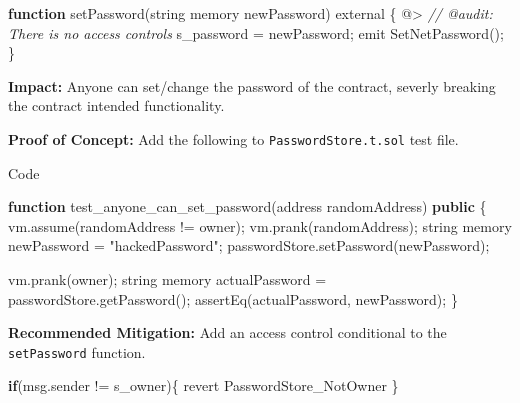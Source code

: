 \documentclass[
  paper=a4,
  ,captions=tableheading
]{scrartcl}
\newenvironment{Shaded}{}{}
\newcommand{\AttributeTok}[1]{\textcolor[rgb]{0.49,0.56,0.16}{#1}}
\newcommand{\CommentTok}[1]{\textcolor[rgb]{0.38,0.63,0.69}{\textit{#1}}}
\newcommand{\ControlFlowTok}[1]{\textcolor[rgb]{0.00,0.44,0.13}{\textbf{#1}}}
\newcommand{\FunctionTok}[1]{\textcolor[rgb]{0.02,0.16,0.49}{#1}}
\newcommand{\KeywordTok}[1]{\textcolor[rgb]{0.00,0.44,0.13}{\textbf{#1}}}
\newcommand{\NormalTok}[1]{#1}
\newcommand{\OperatorTok}[1]{\textcolor[rgb]{0.40,0.40,0.40}{#1}}
\newcommand{\StringTok}[1]{\textcolor[rgb]{0.25,0.44,0.63}{#1}}
\begin{document}
\begin{Shaded}
\begin{Highlighting}[]
\KeywordTok{function} \FunctionTok{setPassword}\NormalTok{(string memory newPassword) external \{}
\NormalTok{@}\OperatorTok{\textgreater{}}  \CommentTok{// @audit: There is no access controls}
\NormalTok{        s\_password }\OperatorTok{=}\NormalTok{ newPassword}\OperatorTok{;}
\NormalTok{        emit }\FunctionTok{SetNetPassword}\NormalTok{()}\OperatorTok{;}
\NormalTok{    \}}
\end{Highlighting}
\end{Shaded}

\textbf{Impact:} Anyone can set/change the password of the contract,
severly breaking the contract intended functionality.

\textbf{Proof of Concept:} Add the following to
\texttt{PasswordStore.t.sol} test file.

Code

\begin{Shaded}
\begin{Highlighting}[]
\KeywordTok{function} \FunctionTok{test\_anyone\_can\_set\_password}\NormalTok{(address randomAddress) }\KeywordTok{public}\NormalTok{ \{}
\NormalTok{        vm}\OperatorTok{.}\FunctionTok{assume}\NormalTok{(randomAddress }\OperatorTok{!=}\NormalTok{ owner)}\OperatorTok{;}
\NormalTok{        vm}\OperatorTok{.}\FunctionTok{prank}\NormalTok{(randomAddress)}\OperatorTok{;}
\NormalTok{        string memory newPassword }\OperatorTok{=} \StringTok{"hackedPassword"}\OperatorTok{;}
\NormalTok{        passwordStore}\OperatorTok{.}\FunctionTok{setPassword}\NormalTok{(newPassword)}\OperatorTok{;}

\NormalTok{        vm}\OperatorTok{.}\FunctionTok{prank}\NormalTok{(owner)}\OperatorTok{;}
\NormalTok{        string memory actualPassword }\OperatorTok{=}\NormalTok{ passwordStore}\OperatorTok{.}\FunctionTok{getPassword}\NormalTok{()}\OperatorTok{;}
        \FunctionTok{assertEq}\NormalTok{(actualPassword}\OperatorTok{,}\NormalTok{ newPassword)}\OperatorTok{;}
\NormalTok{    \}}
\end{Highlighting}
\end{Shaded}

\textbf{Recommended Mitigation:} Add an access control conditional to
the \texttt{setPassword} function.

\begin{Shaded}
\begin{Highlighting}[]

\ControlFlowTok{if}\NormalTok{(msg}\OperatorTok{.}\AttributeTok{sender} \OperatorTok{!=}\NormalTok{ s\_owner)\{}
\NormalTok{  revert PasswordStore\_NotOwner}
\NormalTok{\}}
\end{Highlighting}
\end{Shaded}
\end{document}
